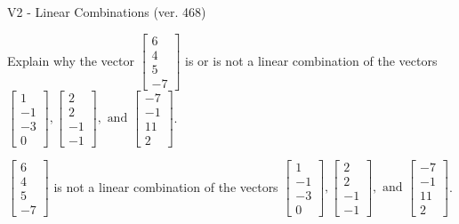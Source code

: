\begin{exercise}
  \begin{exerciseTitle}V2 - Linear Combinations (ver. 468)\end{exerciseTitle}
  \begin{exerciseStatement}
    Explain why the vector \(\left[\begin{array}{c}
6 \\
4 \\
5 \\
-7
\end{array}\right]\)  is or is not a linear 
	combination of the vectors \(\left[\begin{array}{c}
1 \\
-1 \\
-3 \\
0
\end{array}\right] , \left[\begin{array}{c}
2 \\
2 \\
-1 \\
-1
\end{array}\right] , \text{ and } \left[\begin{array}{c}
-7 \\
-1 \\
11 \\
2
\end{array}\right]\).
	


  \end{exerciseStatement}
  \begin{exerciseAnswer}
   \(\left[\begin{array}{c}
6 \\
4 \\
5 \\
-7
\end{array}\right]\) 
  	 is not  
	a linear combination of the vectors \(\left[\begin{array}{c}
1 \\
-1 \\
-3 \\
0
\end{array}\right] , \left[\begin{array}{c}
2 \\
2 \\
-1 \\
-1
\end{array}\right] , \text{ and } \left[\begin{array}{c}
-7 \\
-1 \\
11 \\
2
\end{array}\right]\).

	
  


  \end{exerciseAnswer}
\end{exercise}